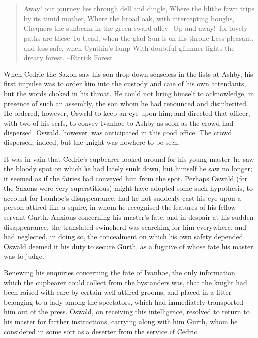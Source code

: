 \chapter{}

\begin{quote}
Away! our journey lies through dell and dingle,
Where the blithe fawn trips by its timid mother,
Where the broad oak, with intercepting boughs,
Chequers the sunbeam in the green-sward alley--
Up and away!--for lovely paths are these
To tread, when the glad Sun is on his throne
Less pleasant, and less safe, when Cynthia's lamp
With doubtful glimmer lights the dreary forest.
--Ettrick Forest
\end{quote}

When Cedric the Saxon saw his son drop down senseless in the lists at
Ashby, his first impulse was to order him into the custody and care of
his own attendants, but the words choked in his throat. He could not
bring himself to acknowledge, in presence of such an assembly, the son
whom he had renounced and disinherited. He ordered, however, Oswald to
keep an eye upon him; and directed that officer, with two of his serfs,
to convey Ivanhoe to Ashby as soon as the crowd had dispersed. Oswald,
however, was anticipated in this good office. The crowd dispersed,
indeed, but the knight was nowhere to be seen.

It was in vain that Cedric's cupbearer looked around for his young
master--he saw the bloody spot on which he had lately sunk down, but
himself he saw no longer; it seemed as if the fairies had conveyed him
from the spot. Perhaps Oswald (for the Saxons were very superstitious)
might have adopted some such hypothesis, to account for Ivanhoe's
disappearance, had he not suddenly cast his eye upon a person attired
like a squire, in whom he recognised the features of his fellow-servant
Gurth. Anxious concerning his master's fate, and in despair at his
sudden disappearance, the translated swineherd was searching for him
everywhere, and had neglected, in doing so, the concealment on which his
own safety depended. Oswald deemed it his duty to secure Gurth, as a
fugitive of whose fate his master was to judge.

Renewing his enquiries concerning the fate of Ivanhoe, the only
information which the cupbearer could collect from the bystanders was,
that the knight had been raised with care by certain well-attired
grooms, and placed in a litter belonging to a lady among the spectators,
which had immediately transported him out of the press. Oswald, on
receiving this intelligence, resolved to return to his master for
farther instructions, carrying along with him Gurth, whom he considered
in some sort as a deserter from the service of Cedric.


